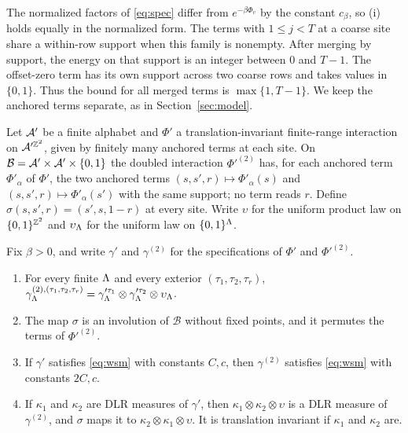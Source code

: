 The normalized factors of \eqref{eq:spec} differ from \(e^{-\beta\Phi_v}\) by the constant \(c_\beta\), so (i) holds equally in the normalized form. The terms with \(1\le j<T\) at a coarse site share a within-row support when this family is nonempty. After merging by support, the energy on that support is an integer between \(0\) and \(T-1\). The offset-zero term has its own support across two coarse rows and takes values in \(\{0,1\}\). Thus the bound for all merged terms is \(\max\{1,T-1\}\). We keep the anchored terms separate, as in Section~\ref{sec:model}.

Let \(\mathcal A'\) be a finite alphabet and \(\Phi'\) a translation-invariant finite-range interaction on \(\mathcal A'^{\mathbb Z^2}\), given by finitely many anchored terms at each site. On \(\mathcal B=\mathcal A'\times\mathcal A'\times\{0,1\}\) the doubled interaction \(\Phi'^{(2)}\) has, for each anchored term \(\Phi'_\alpha\) of \(\Phi'\), the two anchored terms \((s,s',r)\mapsto\Phi'_\alpha(s)\) and \((s,s',r)\mapsto\Phi'_\alpha(s')\) with the same support; no term reads \(r\). Define \(\sigma(s,s',r)=(s',s,1-r)\) at every site. Write \(\upsilon\) for the uniform product law on \(\{0,1\}^{\mathbb Z^2}\) and \(\upsilon_\Lambda\) for the uniform law on \(\{0,1\}^\Lambda\).

\begin{lemma}\label{lem:doubling}
Fix \(\beta>0\), and write \(\gamma'\) and \(\gamma^{(2)}\) for the specifications of \(\Phi'\) and \(\Phi'^{(2)}\).
\begin{enumerate}[label=\textup{(\roman*)}]
\item For every finite \(\Lambda\) and every exterior \((\tau_1,\tau_2,\tau_r)\), \(\gamma^{(2),(\tau_1,\tau_2,\tau_r)}_\Lambda=\gamma'^{\tau_1}_\Lambda\otimes\gamma'^{\tau_2}_\Lambda\otimes\upsilon_\Lambda\).
\item The map \(\sigma\) is an involution of \(\mathcal B\) without fixed points, and it permutes the terms of \(\Phi'^{(2)}\).
\item If \(\gamma'\) satisfies \eqref{eq:wsm} with constants \(C,c\), then \(\gamma^{(2)}\) satisfies \eqref{eq:wsm} with constants \(2C,c\).
\item If \(\kappa_1\) and \(\kappa_2\) are DLR measures of \(\gamma'\), then \(\kappa_1\otimes\kappa_2\otimes\upsilon\) is a DLR measure of \(\gamma^{(2)}\), and \(\sigma\) maps it to \(\kappa_2\otimes\kappa_1\otimes\upsilon\). It is translation invariant if \(\kappa_1\) and \(\kappa_2\) are.
\end{enumerate}
\end{lemma}

